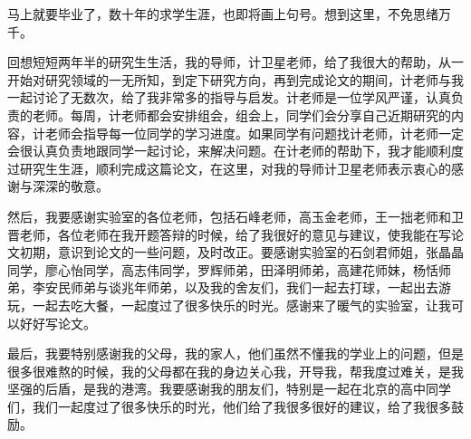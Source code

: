 
\begin{thanks}

马上就要毕业了，数十年的求学生涯，也即将画上句号。想到这里，不免思绪万千。

回想短短两年半的研究生生活，我的导师，计卫星老师，给了我很大的帮助，从一开始对研究领域的一无所知，到定下研究方向，再到完成论文的期间，计老师与我一起讨论了无数次，给了我非常多的指导与启发。计老师是一位学风严谨，认真负责的老师。每周，计老师都会安排组会，组会上，同学们会分享自己近期研究的内容，计老师会指导每一位同学的学习进度。如果同学有问题找计老师，计老师一定会很认真负责地跟同学一起讨论，来解决问题。在计老师的帮助下，我才能顺利度过研究生生涯，顺利完成这篇论文，在这里，对我的导师计卫星老师表示衷心的感谢与深深的敬意。

然后，我要感谢实验室的各位老师，包括石峰老师，高玉金老师，王一拙老师和卫晋老师，各位老师在我开题答辩的时候，给了我很好的意见与建议，使我能在写论文初期，意识到论文的一些问题，及时改正。要感谢实验室的石剑君师姐，张晶晶同学，廖心怡同学，高志伟同学，罗辉师弟，田泽明师弟，高建花师妹，杨恬师弟，李安民师弟与谈兆年师弟，以及我的舍友们，我们一起去打球，一起出去游玩，一起去吃大餐，一起度过了很多快乐的时光。感谢来了暖气的实验室，让我可以好好写论文。

最后，我要特别感谢我的父母，我的家人，他们虽然不懂我的学业上的问题，但是很多很难熬的时候，我的父母都在我的身边关心我，开导我，帮我度过难关，是我坚强的后盾，是我的港湾。我要感谢我的朋友们，特别是一起在北京的高中同学们，我们一起度过了很多快乐的时光，他们给了我很多很好的建议，给了我很多鼓励。
\end{thanks}
